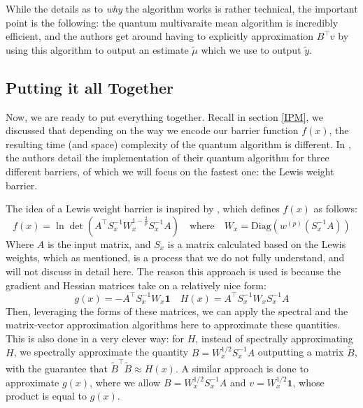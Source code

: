 \documentclass[11pt]{article}
\begin{document}
While the details as to \textit{why} the algorithm works is rather technical, the important point is the following: 
the quantum multivaraite mean algorithm is incredibly efficient, and the authors get around having to 
explicitly approximation \( B^{\top} v \) by using this algorithm to output an estimate \( \tilde \mu \) which 
we use to output \( \tilde y \). 
 

\subsection{Putting it all Together}
\label{combining}
Now, we are ready to put everything together. Recall in section \ref{IPM}, we discussed that depending on the way 
we encode our barrier function \( f(x) \), the resulting time (and space) complexity of the quantum algorithm is 
different. In \cite{apersQuantumSpeedupsLinear2024}, the authors detail the implementation of their quantum 
algorithm for three different barriers, of which we will focus on the fastest one: the Lewis weight barrier. 
   
The idea of a Lewis weight barrier is inspired by \cite{leeSolvingLinearPrograms}, which defines \( f(x) \) 
as follows:
\[
f(x) = \ln \det(A^{\top}S_x^{-1} W_x^{1 - \frac{2}{p}}S_x^{-1}A) \quad \text{where}\quad 
W_x = \mathrm{Diag}(w^{(p)}(S_x^{-1}A))
\] 
Where \( A \) is the input matrix, and \( S_x \) is a matrix calculated based on the Lewis weights, which as 
mentioned, is a process that we do not fully understand, and will not discuss in detail here. The reason 
this approach is used is because the gradient and Hessian matrices take on a relatively nice form:
\[
	g(x) = -A^{\top} S_x^{-1} W_x \mathbf{1} \quad H(x) = A^{\top} S_x^{-1}W_x S_x ^{-1} A
\] 
Then, leveraging the forms of these matrices, we can apply the spectral and the matrix-vector 
approximation algorithms here to approximate these quantities. This is also done in a very clever way: for \( H \), 
instead of spectrally approximating \( H \), we spectrally approximate the quantity \(B = W_x^{1 / 2}S_x^{-1} A \)
outputting a matrix \( \tilde B \), with the guarantee that \( \tilde B^{\top} \tilde B \approx H(x) \). A similar 
approach is done to approximate \( g(x) \), where we allow \( B = W_x^{1 / 2}S_x^{-1}A \) and 
\( v = W_x^{1 / 2} \mathbf 1 \), whose product is equal to \( g(x) \). 
\end{document}
